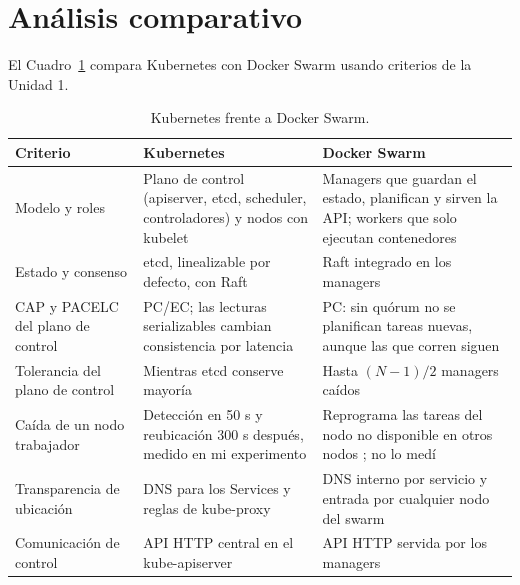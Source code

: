 \documentclass[11pt,a4paper]{article}
\begin{document}
\section{Análisis comparativo}

El Cuadro~\ref{tab:comparativa} compara Kubernetes con Docker Swarm usando criterios de la Unidad 1.

\begin{table}[H]
\centering
\small
\caption{Kubernetes frente a Docker Swarm.}
\label{tab:comparativa}
\renewcommand{\arraystretch}{1.25}
\begin{tabularx}{\textwidth}{@{}>{\raggedright\arraybackslash}p{2.9cm} >{\raggedright\arraybackslash}X >{\raggedright\arraybackslash}X@{}}
\toprule
\textbf{Criterio} & \textbf{Kubernetes} & \textbf{Docker Swarm} \\
\midrule
Modelo y roles & Plano de control (apiserver, etcd, scheduler, controladores) y nodos con kubelet \cite{k8s_components} & Managers que guardan el estado, planifican y sirven la API; workers que solo ejecutan contenedores \cite{swarm_nodes} \\
Estado y consenso & etcd, linealizable por defecto, con Raft \cite{etcd_api} & Raft integrado en los managers \cite{swarm_raft} \\
CAP y PACELC del plano de control & PC/EC; las lecturas serializables cambian consistencia por latencia \cite{etcd_api} & PC: sin quórum no se planifican tareas nuevas, aunque las que corren siguen \cite{swarm_raft} \\
Tolerancia del plano de control & Mientras etcd conserve mayoría & Hasta $(N-1)/2$ managers caídos \cite{swarm_raft} \\
Caída de un nodo trabajador & Detección en 50 s y reubicación 300 s después, medido en mi experimento \cite{k8s_kcm,k8s_taints} & Reprograma las tareas del nodo no disponible en otros nodos \cite{swarm_concepts}; no lo medí \\
Transparencia de ubicación & DNS para los Services y reglas de kube-proxy \cite{k8s_dns,k8s_components} & DNS interno por servicio y entrada por cualquier nodo del swarm \cite{swarm_concepts} \\
Comunicación de control & API HTTP central en el kube-apiserver \cite{k8s_components} & API HTTP servida por los managers \cite{swarm_nodes} \\
\bottomrule
\end{tabularx}
\end{table}
\end{document}

